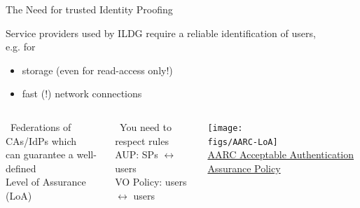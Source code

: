 \documentclass[aspectratio=169,xcolor=dvipsnames]{beamer}
\def\Darrow{\ding{220}}
\newcommand{\bi}{\begin{itemize}}
\newcommand{\ei}{\end{itemize}}
\def\figs{figs3}
\begin{document}
\begin{frame}{The Need for trusted Identity Proofing}

  Service providers used by ILDG \alert{require a reliable identification} of users, \\
  e.g. for
  \bi
  \item storage (even for read-access only!)
  \item fast (!) network connections
  \ei


  \begin{columns}
    \Darrow\ Federations of CAs/IdPs which\\
    \hspace*{5mm} can guarantee a well-defined\\
    \hspace*{5mm}\alert{Level of Assurance} (LoA)

    \vspace*{5mm}
    \Darrow\ You need to respect rules\\
    \hspace*{5mm} AUP: SPs $\leftrightarrow$ users\\
    \hspace*{5mm} VO Policy: users $\leftrightarrow$ users

    \texttt{[image: \\figs/AARC-LoA]}
    \\
      {\small
        \href{https://docs.google.com/document/d/1BBJYzSCIGlDrV32w-6vNuSdojIlQMf3ObhsYVgG3P6Q}
             {AARC Acceptable Authentication Assurance Policy}
      }
  \end{columns}

  \vfill
\end{frame}
\end{document}
